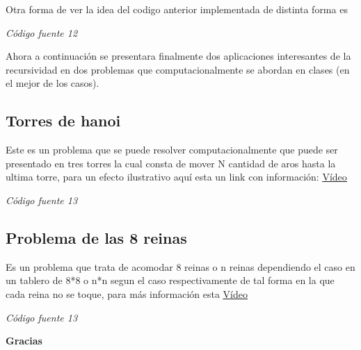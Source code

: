 \documentclass[10pt,executivepaper]{article}
\begin{document}
Otra forma de ver la idea del codigo anterior implementada de distinta forma es

\begin{center}
\textit{Código fuente 12}\\
\end{center}
Ahora a continuación se presentara finalmente dos aplicaciones interesantes de la recursividad en dos problemas que computacionalmente se abordan en clases (en el mejor de los casos).
\\
\subsection{Torres de hanoi}
Este es un problema que se puede resolver computacionalmente que puede ser presentado en tres torres la cual consta de mover N cantidad de aros hasta la ultima torre, para un efecto ilustrativo aquí esta un link con información: \href{https://www.youtube.com/watch?v=LM68IQvIo_E}{\underline{Vídeo}}

\begin{center}
\textit{Código fuente 13}\\
\end{center}
\subsection{Problema de las 8 reinas}
Es un problema que trata de acomodar 8 reinas o n reinas dependiendo el caso en un tablero de 8*8 o n*n segun el caso respectivamente de tal forma en la que cada reina no se toque, para más información esta \href{https://www.youtube.com/watch?v=WOZ4wDt-iYA}{\underline{Vídeo}}

\begin{center}
\textit{Código fuente 13}\\
\end{center}
\begin{center}
\textbf{Gracias}\\
\end{center}
\printindex
\end{document}
